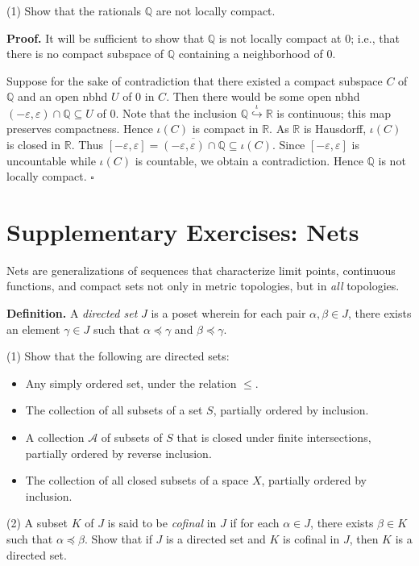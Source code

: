 \documentclass[a4paper]{article}
\newcommand{\R}{\mathbb{R}}
\newcommand{\Q}{\mathbb{Q}}
\begin{document}
(1) Show that the rationals $\Q$ are not locally compact.

\textbf{Proof.} It will be sufficient to show that $\Q$ is not locally compact at $0$; i.e., that there is no compact subspace of $\Q$ containing a neighborhood of $0$.

Suppose for the sake of contradiction that there existed a compact subspace $C$ of $\Q$ and an open nbhd $U$ of $0$ in $C$. Then there would be some open nbhd $(-\varepsilon, \varepsilon) \cap \Q \subseteq U$ of $0$. Note that the inclusion $\Q \overset{\iota}{\hookrightarrow} \R$ is continuous; this map preserves compactness. Hence $\iota(C)$ is compact in $\R$. As $\R$ is Hausdorff, $\iota(C)$ is closed in $\R$. Thus $[-\varepsilon, \varepsilon] = \overline{(-\varepsilon, \varepsilon) \cap \Q} \subseteq \iota(C)$. Since $[-\varepsilon, \varepsilon]$ is uncountable while $\iota(C)$ is countable, we obtain a contradiction. Hence $\Q$ is not locally compact. $\square$

\section*{Supplementary Exercises: Nets}

Nets are generalizations of sequences that characterize limit points, continuous functions, and compact sets not only in metric topologies, but in \emph{all} topologies.

\textbf{Definition.} A \emph{directed set} $J$ is a poset wherein for each pair $\alpha, \beta \in J$, there exists an element $\gamma \in J$ such that $\alpha \preceq \gamma$ and $\beta \preceq \gamma$.

(1) Show that the following are directed sets:
\begin{itemize}
    \item Any simply ordered set, under the relation $\leq$.
    \item The collection of all subsets of a set $S$, partially ordered by inclusion.
    \item A collection $\mathscr{A}$ of subsets of $S$ that is closed under finite intersections, partially ordered by reverse inclusion.
    \item The collection of all closed subsets of a space $X$, partially ordered by inclusion.
\end{itemize}

(2) A subset $K$ of $J$ is said to be \emph{cofinal} in $J$ if for each $\alpha \in J$, there exists $\beta \in K$ such that $\alpha \preceq \beta$. Show that if $J$ is a directed set and $K$ is cofinal in $J$, then $K$ is a directed set.
\end{document}
